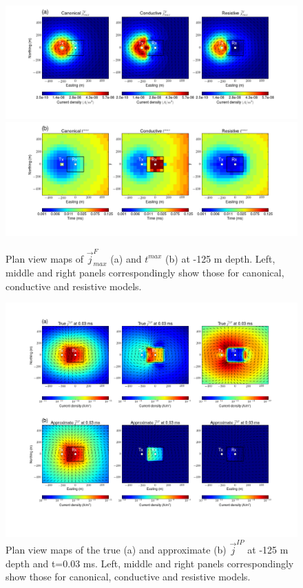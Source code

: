 \documentclass[a4paper, 11pt]{article}
\renewcommand {\j}  { {\vec j} }
\begin{document}
\begin{figure}[htb]
  \centering  \includegraphics[width=1.0\textwidth]{figures/threecasesresp/jmax.png}\\
  \centering  \includegraphics[width=1.0\textwidth]{figures/threecasesresp/tmax.png}
  \caption{Plan view maps of $\j^{F}_{max}$ (a) and $t^{max}$ (b) at -125 m depth. Left, middle and right panels correspondingly show those for canonical, conductive and resistive models.}
  \label{F:jmaxtmax}
\end{figure}

\begin{figure}[htb]
\centering  
    \includegraphics[width=1.0\textwidth]{figures/threecasesresp/jIPcomparison_ch6.png}
    \caption{Plan view maps of the true (a) and approximate (b) $\j^{IP}$ at -125 m depth and t=0.03 ms. Left, middle and right panels correspondingly show those for canonical, conductive and resistive models.}
  \label{F:jIPcomparison_early}
\end{figure}
\end{document}
